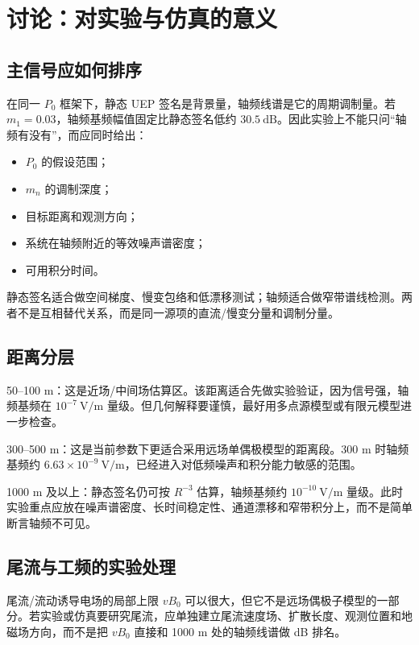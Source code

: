 \section{讨论：对实验与仿真的意义}

\subsection{主信号应如何排序}

在同一 $P_0$ 框架下，静态 UEP 签名是背景量，轴频线谱是它的周期调制量。若 $m_1=0.03$，轴频基频幅值固定比静态签名低约 $30.5\ \mathrm{dB}$。因此实验上不能只问“轴频有没有”，而应同时给出：
\begin{itemize}
    \item $P_0$ 的假设范围；
    \item $m_n$ 的调制深度；
    \item 目标距离和观测方向；
    \item 系统在轴频附近的等效噪声谱密度；
    \item 可用积分时间。
\end{itemize}

静态签名适合做空间梯度、慢变包络和低漂移测试；轴频适合做窄带谱线检测。两者不是互相替代关系，而是同一源项的直流/慢变分量和调制分量。

\subsection{距离分层}

50--100 m：这是近场/中间场估算区。该距离适合先做实验验证，因为信号强，轴频基频在 $10^{-7}\ \mathrm{V/m}$ 量级。但几何解释要谨慎，最好用多点源模型或有限元模型进一步检查。

300--500 m：这是当前参数下更适合采用远场单偶极模型的距离段。300 m 时轴频基频约 $6.63\times10^{-9}\ \mathrm{V/m}$，已经进入对低频噪声和积分能力敏感的范围。

1000 m 及以上：静态签名仍可按 $R^{-3}$ 估算，轴频基频约 $10^{-10}\ \mathrm{V/m}$ 量级。此时实验重点应放在噪声谱密度、长时间稳定性、通道漂移和窄带积分上，而不是简单断言轴频不可见。

\subsection{尾流与工频的实验处理}

尾流/流动诱导电场的局部上限 $vB_0$ 可以很大，但它不是远场偶极子模型的一部分。若实验或仿真要研究尾流，应单独建立尾流速度场、扩散长度、观测位置和地磁场方向，而不是把 $vB_0$ 直接和 1000 m 处的轴频线谱做 dB 排名。

